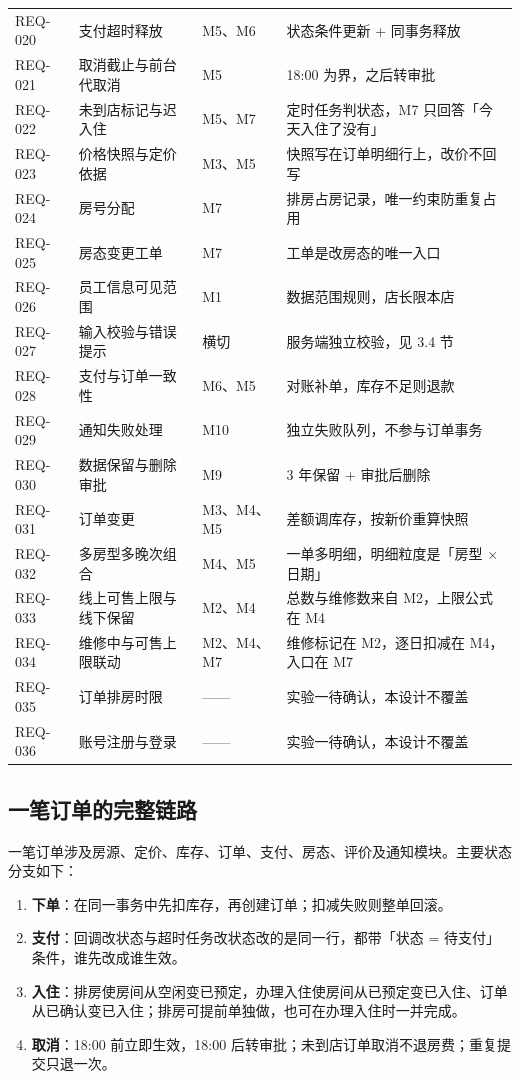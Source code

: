 {\begin{xltabular}{\textwidth}{@{}p{1.55cm}p{4.15cm}p{3.5cm}X@{}}
REQ-020 & 支付超时释放 & M5、M6 & 状态条件更新 + 同事务释放 \\
REQ-021 & 取消截止与前台代取消 & M5 & 18:00 为界，之后转审批 \\
REQ-022 & 未到店标记与迟入住 & M5、M7 & 定时任务判状态，M7 只回答「今天入住了没有」 \\
REQ-023 & 价格快照与定价依据 & M3、M5 & 快照写在订单明细行上，改价不回写 \\
REQ-024 & 房号分配 & M7 & 排房占房记录，唯一约束防重复占用 \\
REQ-025 & 房态变更工单 & M7 & 工单是改房态的唯一入口 \\
REQ-026 & 员工信息可见范围 & M1 & 数据范围规则，店长限本店 \\
REQ-027 & 输入校验与错误提示 & 横切 & 服务端独立校验，见 3.4 节 \\
REQ-028 & 支付与订单一致性 & M6、M5 & 对账补单，库存不足则退款 \\
REQ-029 & 通知失败处理 & M10 & 独立失败队列，不参与订单事务 \\
REQ-030 & 数据保留与删除审批 & M9 & 3 年保留 + 审批后删除 \\
REQ-031 & 订单变更 & M3、M4、M5 & 差额调库存，按新价重算快照 \\
REQ-032 & 多房型多晚次组合 & M4、M5 & 一单多明细，明细粒度是「房型 $\times$ 日期」 \\
REQ-033 & 线上可售上限与线下保留 & M2、M4 & 总数与维修数来自 M2，上限公式在 M4 \\
REQ-034 & 维修中与可售上限联动 & M2、M4、M7 & 维修标记在 M2，逐日扣减在 M4，入口在 M7 \\
REQ-035 & 订单排房时限 & —— & 实验一待确认，本设计不覆盖 \\
REQ-036 & 账号注册与登录 & —— & 实验一待确认，本设计不覆盖 \\
\end{xltabular}
}

\subsection{一笔订单的完整链路}

一笔订单涉及房源、定价、库存、订单、支付、房态、评价及通知模块。主要状态分支如下：

\begin{enumerate}[leftmargin=3.2em]
  \item \textbf{下单}：在同一事务中先扣库存，再创建订单；扣减失败则整单回滚。
  \item \textbf{支付}：回调改状态与超时任务改状态改的是同一行，都带「状态 = 待支付」条件，谁先改成谁生效。
  \item \textbf{入住}：排房使房间从空闲变已预定，办理入住使房间从已预定变已入住、订单从已确认变已入住；排房可提前单独做，也可在办理入住时一并完成。
  \item \textbf{取消}：18:00 前立即生效，18:00 后转审批；未到店订单取消不退房费；重复提交只退一次。
\end{enumerate}
